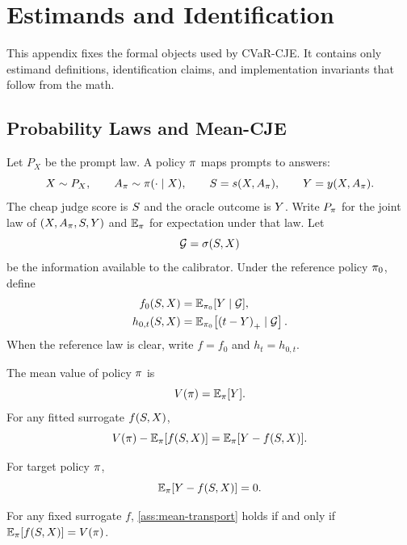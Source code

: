 \section{Estimands and Identification}
\label{app:estimands}

This appendix fixes the formal objects used by CVaR-CJE. It contains only
estimand definitions, identification claims, and implementation invariants
that follow from the math.

\subsection{Probability Laws and Mean-CJE}

Let $P_X$ be the prompt law. A policy $\pi$ maps prompts to answers:
\[
X\sim P_X,\qquad
A_\pi\sim\pi(\cdot\mid X),\qquad
S=s(X,A_\pi),\qquad
Y=y(X,A_\pi).
\]
The cheap judge score is $S$ and the oracle outcome is $Y$. Write
$P_\pi$ for the joint law of $(X,A_\pi,S,Y)$ and
$\mathbb{E}_\pi$ for expectation under that law. Let
\[
\mathcal{G}=\sigma(S,X)
\]
be the information available to the calibrator. Under the reference policy
$\pi_{0}$, define
\begin{align}
f_0(S,X)
&=\mathbb{E}_{\pi_{0}}[Y\mid\mathcal{G}],\\
h_{0,t}(S,X)
&=\mathbb{E}_{\pi_{0}}\!\left[\left(t-Y\right)_{+}\mid\mathcal{G}\right].
\end{align}
When the reference law is clear, write $f=f_0$ and $h_t=h_{0,t}$.

The mean value of policy $\pi$ is
\begin{equation}
V(\pi)=\mathbb{E}_\pi[Y].
\end{equation}
For any fitted surrogate $f(S,X)$,
\begin{equation}
V(\pi)-\mathbb{E}_\pi[f(S,X)]
=\mathbb{E}_\pi[Y-f(S,X)].
\label{eq:mean-transport-identity}
\end{equation}

\begin{assumption}
\label{ass:mean-transport}
For target policy $\pi$,
\[
\mathbb{E}_\pi[Y-f(S,X)]=0.
\]
\end{assumption}

\begin{proposition}
\label{prop:formal-mean-identification}
For any fixed surrogate $f$, \cref{ass:mean-transport} holds if and only if
$\mathbb{E}_\pi[f(S,X)]=V(\pi)$.
\end{proposition}

